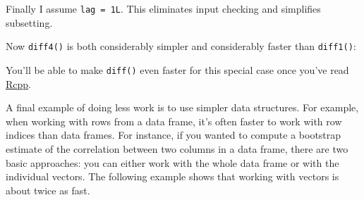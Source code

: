 Finally I assume \texttt{lag = 1L}. This eliminates input checking and
simplifies subsetting.

\begin{Shaded}
\begin{Highlighting}[]
\StringTok{ }
  \StringTok{ }
  \StringTok{ }\NormalTok{) }

  \NormalTok{x[-}\NormalTok{] -}\StringTok{ }
\NormalTok{\}}
\NormalTok{(}\NormalTok{(}\NormalTok{:}\NormalTok{))}
\end{Highlighting}
\end{Shaded}

Now \texttt{diff4()} is both considerably simpler and considerably
faster than \texttt{diff1()}:

\begin{Shaded}
\begin{Highlighting}[]
\StringTok{ }\NormalTok{(}\NormalTok{)}
\NormalTok{(}
\NormalTok{)}
\end{Highlighting}
\end{Shaded}

You'll be able to make \texttt{diff()} even faster for this special case
once you've read \hyperref[rcpp]{Rcpp}.

A final example of doing less work is to use simpler data structures.
For example, when working with rows from a data frame, it's often faster
to work with row indices than data frames. For instance, if you wanted
to compute a bootstrap estimate of the correlation between two columns
in a data frame, there are two basic approaches: you can either work
with the whole data frame or with the individual vectors. The following
example shows that working with vectors is about twice as fast.

